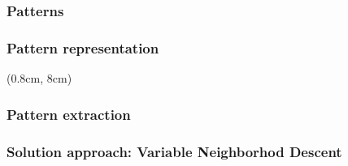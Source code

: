 \section[Graph-based VND]{\thirdtitle}

\begin{frame}
\frametitle{\textbf{Patterns}}


\end{frame}

\begin{frame}
\frametitle{\textbf{Pattern representation}}
  \begin{adjustbox}{max totalsize={\textwidth}{\textheight},left, trim=15pt 0 0 0}
    
  \end{adjustbox}

  \begin{textblock*}{1.1\textwidth}(0.8cm, 8cm)
    \begin{flushleft}
    \end{flushleft}
  \end{textblock*}
\end{frame}

\begin{frame}
\frametitle{\textbf{Pattern extraction}}
\end{frame}

\begin{frame}
\frametitle{\textbf{Solution approach: Variable Neighborhod Descent}}
  \pause
  \begin{adjustbox}{max totalsize={0.8\textwidth}{0.8\textheight},center}
    
  \end{adjustbox}

\end{frame}

